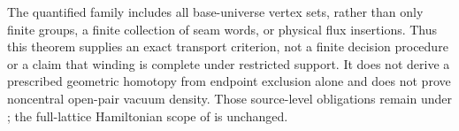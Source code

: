 \documentclass{article}
\begin{document}
The quantified family includes all base-universe vertex sets, rather than only
finite groups, a finite collection of seam words, or physical flux
insertions. Thus this theorem supplies an exact transport criterion, not
a finite decision procedure or a claim that winding is complete under
restricted support. It does not derive a prescribed geometric homotopy
from endpoint exclusion alone and does not prove noncentral open-pair
vacuum density. Those source-level obligations remain under
; the full-lattice Hamiltonian scope of  is
unchanged.


\end{document}
